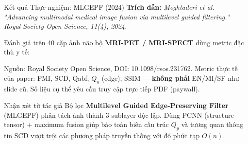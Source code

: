 \documentclass{beamer}
\begin{document}
\begin{frame}{Kết quả Thực nghiệm: MLGEPF (2024)}
    \small
    \textbf{Trích dẫn:} \textit{Moghtaderi et al. "Advancing multimodal medical image fusion via multilevel guided filtering." Royal Society Open Science, 11(4), 2024.}

    \vspace{0.1cm}
    Đánh giá trên 40 cặp ảnh não bộ \textbf{MRI-PET / MRI-SPECT} dùng metric đặc thù y tế:
    
    \vspace{0.1cm}
    \begin{table}
        \centering
        \renewcommand{\arraystretch}{1.2}
    \end{table}
    {\tiny Nguồn: Royal Society Open Science, DOI: 10.1098/rsos.231762. Metric thực tế của paper: FMI, SCD, Qabf, $Q_y$ (edge), SSIM --- \textbf{không phải} EN/MI/SF như slide cũ. Số liệu cụ thể yêu cầu truy cập trực tiếp PDF (paywall).}

    \begin{block}{Nhận xét từ tác giả}
        Bộ lọc \textbf{Multilevel Guided Edge-Preserving Filter} (MLGEPF) phân tách ảnh thành 3 sublayer độc lập. Dùng PCNN (structure tensor) + maximum fusion giúp bảo toàn biên cấu trúc $Q_y$ và tương quan thông tin SCD vượt trội các phương pháp truyền thống với độ phức tạp $O(n)$.
    \end{block}
\end{frame}
\end{document}
